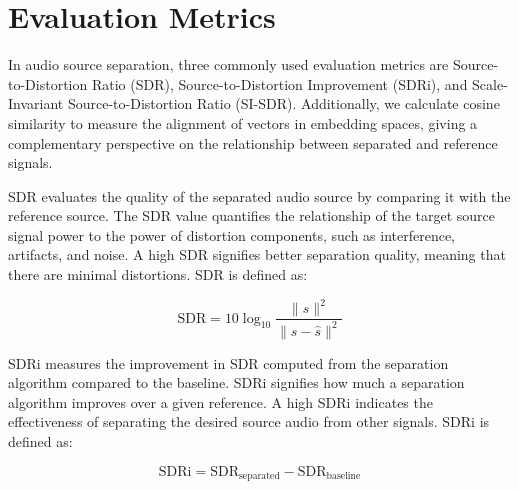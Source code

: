 \documentclass[11pt]{article}
\begin{document}

\section{Evaluation Metrics}
In audio source separation, three commonly used evaluation metrics are Source-to-Distortion Ratio (SDR), Source-to-Distortion Improvement (SDRi), and Scale-Invariant Source-to-Distortion Ratio (SI-SDR). Additionally, we calculate cosine similarity to measure the alignment of vectors in embedding spaces, giving a complementary perspective on the relationship between separated and reference signals.

SDR \cite{sdr} evaluates the quality of the separated audio source by comparing it with the reference source. The SDR value quantifies the relationship of the target source signal power to the power of distortion components, such as interference, artifacts, and noise. A high SDR signifies better separation quality, meaning that there are minimal distortions. SDR is defined as:


\begin{equation}
    \label{sdr_equation}
    \text{SDR} = 10 \log_{10} \frac{\| s \|^2}{\| s - \hat{s} \|^2}
\end{equation}


SDRi \cite{sdr} measures the improvement in SDR computed from the separation algorithm compared to the baseline. SDRi signifies how much a separation algorithm improves over a given reference. A high SDRi indicates the effectiveness of separating the desired source audio from other signals. SDRi is defined as:


\begin{equation}
    \label{sdri_equation}
    \text{SDRi} = \text{SDR}_{\text{separated}} - \text{SDR}_{\text{baseline}}
\end{equation}
\end{document}
